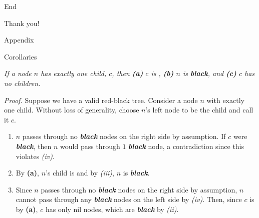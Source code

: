 \documentclass[aspectratio=169]{beamer}
\newcommand{\textib}[1]{\textit{\textbf{{#1}}}}
\newcommand{\red}{\textib{\color{red}{red }}}
\newcommand{\proposition}[1]{\begin{tcolorbox}[title={Proposition}]\small{\textit{{#1}}}\end{tcolorbox}}
\begin{document}
\begin{frame}{End}
    \begin{center}
        Thank you!
    \end{center}
\end{frame}


\begin{frame}{Appendix}
\end{frame}


\begin{frame}{Corollaries}
    \proposition{
        If a node $n$ has exactly one child, $c$, then 
        \textnormal{\textbf{(a)}} $c$ is \red,
        \textnormal{\textbf{(b)}} $n$ is \textib{black}, and
        \textnormal{\textbf{(c)}} $c$ has no children.
    }
    \textit{Proof.}
    Suppose we have a valid red-black tree. Consider a node $n$ with exactly one child. 
    Without loss of generality, choose $n$'s left node to be the child and call it $c$.
    \begin{enumerate}[label=\textbf{(\alph*)}]
        \item<2-> $n$ passes through no \textib{black} nodes on the right side by assumption. If $c$ were 
            \textib{black}, then $n$ would pass through $1$ \textib{black} node, a contradiction 
            since this violates \textit{(iv)}.
        \item<3-> By \textbf{(a)}, $n$'s child is \red and by \textit{(iii)}, $n$ is \textib{black}.
        \item <4-> Since $n$ passes through no \textib{black} nodes on the right side by assumption,
            $n$ cannot pass through any \textib{black} nodes on the left side by \textit{(iv)}. Then,
            since $c$ is \red by \textbf{(a)}, $c$ has only nil nodes, which are \textib{black} by
            \textit{(ii)}.
        \end{enumerate}


\end{frame}
\end{document}

